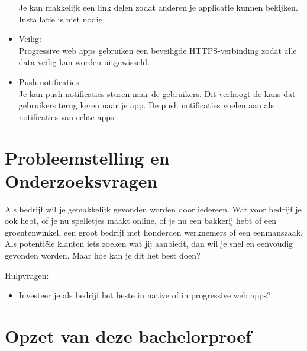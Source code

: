 \begin{itemize}
	Je kan makkelijk een link delen zodat anderen je applicatie kunnen bekijken. Installatie is niet nodig.
	\\
		\item Veilig: \\
	Progressive web apps gebruiken een beveiligde HTTPS-verbinding zodat alle data veilig kan worden uitgewisseld.
	\\
		\item Push notificaties \\
	Je kan push notificaties sturen naar de gebruikers. Dit verhoogt de kans dat gebruikers terug keren naar je app. De push notificaties voelen aan als notificaties van echte apps.
	\\
\end{itemize}





\section{Probleemstelling en Onderzoeksvragen}
\label{sec:onderzoeksvragen}


Als bedrijf wil je gemakkelijk gevonden worden door iedereen. Wat voor bedrijf je ook hebt, of je nu spelletjes maakt online, of je nu een bakkerij hebt of een groentenwinkel, een groot bedrijf met honderden werknemers of een eenmanszaak. Als potentiële klanten iets zoeken wat jij aanbiedt, dan wil je snel en eenvoudig gevonden worden. Maar hoe kan je dit het best doen? 

Hulpvragen:
\begin{itemize}  
	\item Investeer je als bedrijf het beste in native of in progressive web apps?
\end{itemize}



\section{Opzet van deze bachelorproef}
\label{sec:opzet-bachelorproef}


